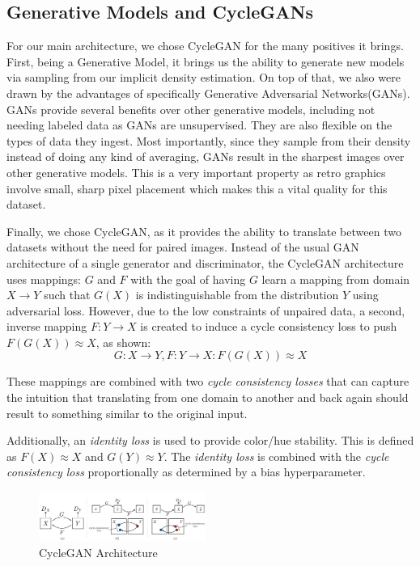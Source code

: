\documentclass[10pt,twocolumn,letterpaper]{article}
\begin{document}
\subsection{Generative Models and CycleGANs}
For our main architecture, we chose CycleGAN for the many positives it brings. First, being a Generative Model, it brings us the ability to generate new models via sampling from our implicit density estimation. On top of that, we also were drawn by the advantages of specifically Generative Adversarial Networks(GANs)\cite{GAN}. GANs provide several benefits over other generative models, including not needing labeled data as GANs are unsupervised. They are also flexible on the types of data they ingest. Most importantly, since they sample from their density instead of doing any kind of averaging, GANs result in the sharpest images over other generative models. This is a very important property as retro graphics involve small, sharp pixel placement which makes this a vital quality for this dataset.

Finally, we chose CycleGAN\cite{CycleGAN}, as it provides the ability to translate between two datasets without the need for paired images. Instead of the usual GAN architecture of a single generator and discriminator, the CycleGAN architecture uses mappings: $G$ and $F$ with the goal of having $G$ learn a mapping from domain $X \rightarrow Y$ such that $G(X)$ is indistinguishable from the distribution $Y$ using adversarial loss. However, due to the low constraints of unpaired data, a second, inverse mapping $F: Y \rightarrow X$ is created to induce a cycle consistency loss to push $F(G(X)) \approx X$, as shown:
\begin{equation*}
   G: X \rightarrow Y, F: Y \rightarrow X : F(G(X)) \approx X
\end{equation*}

These mappings are combined with two \textit{cycle consistency losses} that can capture the intuition that translating from one domain to another and back again should result to something similar to the original input.

Additionally, an \textit{identity loss} is used to provide color/hue stability. This is defined as $F(X) \approx X$ and $G(Y) \approx Y$. The \textit{identity loss} is combined with the \textit{cycle consistency loss} proportionally as determined by a bias hyperparameter.


\begin{figure}[H]
   \centering
   \includegraphics[width=0.485\textwidth]{figures/CycleGANChart.png}
   \caption{CycleGAN Architecture}
\end{figure}
\end{document}
